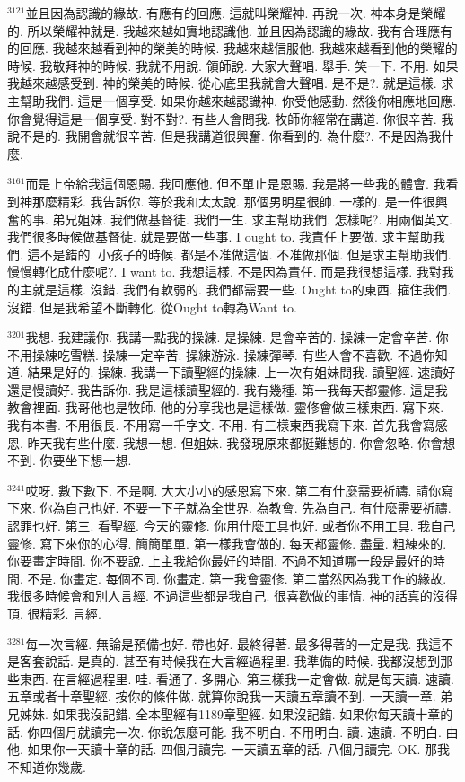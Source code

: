 \documentclass{book}
\begin{document}
$^{3121}$並且因為認識的緣故.
有應有的回應.
這就叫榮耀神.
再說一次.
神本身是榮耀的.
所以榮耀神就是.
我越來越如實地認識他.
並且因為認識的緣故.
我有合理應有的回應.
我越來越看到神的榮美的時候.
我越來越信服他.
我越來越看到他的榮耀的時候.
我敬拜神的時候.
我就不用說.
領師說.
大家大聲唱.
舉手.
笑一下.
不用.
如果我越來越感受到.
神的榮美的時候.
從心底里我就會大聲唱.
是不是?.
就是這樣.
求主幫助我們.
這是一個享受.
如果你越來越認識神.
你受他感動.
然後你相應地回應.
你會覺得這是一個享受.
對不對?.
有些人會問我.
牧師你經常在講道.
你很辛苦.
我說不是的.
我開會就很辛苦.
但是我講道很興奮.
你看到的.
為什麼?.
不是因為我什麼.

$^{3161}$而是上帝給我這個恩賜.
我回應他.
但不單止是恩賜.
我是將一些我的體會.
我看到神那麼精彩.
我告訴你.
等於我和太太說.
那個男明星很帥.
一樣的.
是一件很興奮的事.
弟兄姐妹.
我們做基督徒.
我們一生.
求主幫助我們.
怎樣呢?.
用兩個英文.
我們很多時候做基督徒.
就是要做一些事.
I ought to.
我責任上要做.
求主幫助我們.
這不是錯的.
小孩子的時候.
都是不准做這個.
不准做那個.
但是求主幫助我們.
慢慢轉化成什麼呢?.
I want to.
我想這樣.
不是因為責任.
而是我很想這樣.
我對我的主就是這樣.
沒錯.
我們有軟弱的.
我們都需要一些.
Ought to的東西.
箍住我們.
沒錯.
但是我希望不斷轉化.
從Ought to轉為Want to.

$^{3201}$我想.
我建議你.
我講一點我的操練.
是操練.
是會辛苦的.
操練一定會辛苦.
你不用操練吃雪糕.
操練一定辛苦.
操練游泳.
操練彈琴.
有些人會不喜歡.
不過你知道.
結果是好的.
操練.
我講一下讀聖經的操練.
上一次有姐妹問我.
讀聖經.
速讀好還是慢讀好.
我告訴你.
我是這樣讀聖經的.
我有幾種.
第一我每天都靈修.
這是我教會裡面.
我哥他也是牧師.
他的分享我也是這樣做.
靈修會做三樣東西.
寫下來.
我有本書.
不用很長.
不用寫一千字文.
不用.
有三樣東西我寫下來.
首先我會寫感恩.
昨天我有些什麼.
我想一想.
但姐妹.
我發現原來都挺難想的.
你會忽略.
你會想不到.
你要坐下想一想.

$^{3241}$哎呀.
數下數下.
不是啊.
大大小小的感恩寫下來.
第二有什麼需要祈禱.
請你寫下來.
你為自己也好.
不要一下子就為全世界.
為教會.
先為自己.
有什麼需要祈禱.
認罪也好.
第三.
看聖經.
今天的靈修.
你用什麼工具也好.
或者你不用工具.
我自己靈修.
寫下來你的心得.
簡簡單單.
第一樣我會做的.
每天都靈修.
盡量.
粗練來的.
你要畫定時間.
你不要說.
上主我給你最好的時間.
不過不知道哪一段是最好的時間.
不是.
你畫定.
每個不同.
你畫定.
第一我會靈修.
第二當然因為我工作的緣故.
我很多時候會和別人言經.
不過這些都是我自己.
很喜歡做的事情.
神的話真的沒得頂.
很精彩.
言經.

$^{3281}$每一次言經.
無論是預備也好.
帶也好.
最終得著.
最多得著的一定是我.
我這不是客套說話.
是真的.
甚至有時候我在大言經過程里.
我準備的時候.
我都沒想到那些東西.
在言經過程里.
哇.
看通了.
多開心.
第三樣我一定會做.
就是每天讀.
速讀.
五章或者十章聖經.
按你的條件做.
就算你說我一天讀五章讀不到.
一天讀一章.
弟兄姊妹.
如果我沒記錯.
全本聖經有1189章聖經.
如果沒記錯.
如果你每天讀十章的話.
你四個月就讀完一次.
你說怎麼可能.
我不明白.
不用明白.
讀.
速讀.
不明白.
由他.
如果你一天讀十章的話.
四個月讀完.
一天讀五章的話.
八個月讀完.
OK.
那我不知道你幾歲.
\end{document}

